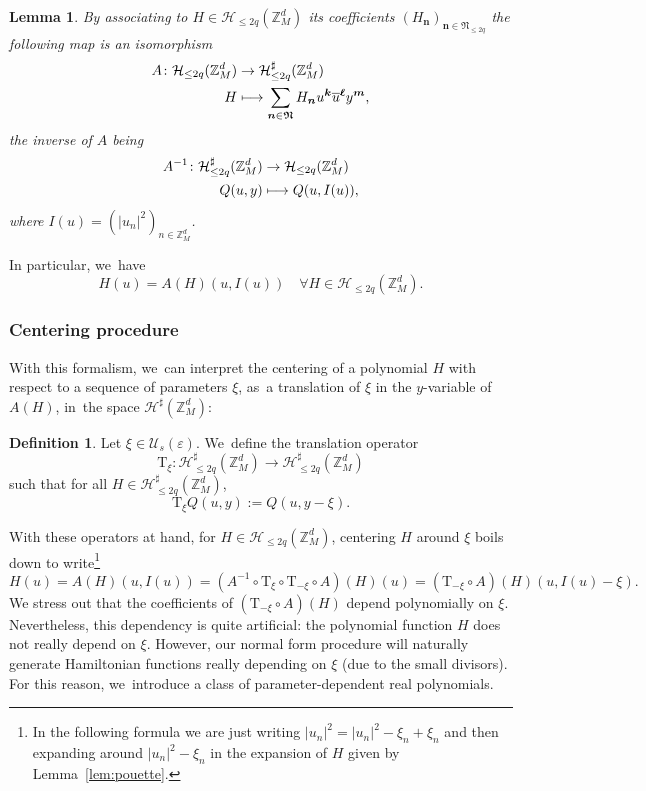 \documentclass[JEP,XML,SOM,Unicode,published]{cedram}
\newcommand\mto{\mathchoice{\longmapsto}{\mapsto}{\mapsto}{\mapsto}}
\theoremstyle{plain}
\newtheorem{lemma}[theorem]{Lemma}
\theoremstyle{definition}
\newtheorem{definition}[theorem]{Definition}
\newcommand{\nb}{{\boldsymbol n}}
\newcommand{\kb}{{\boldsymbol k}}
\newcommand{\lb}{{\boldsymbol \ell}}
\newcommand{\mb}{{\boldsymbol m}}
\newcommand{\Nb}{{\boldsymbol{\mathfrak{N}}}}
\newcommand{\Z}{\mathbb{Z}}
\newcommand{\1}{\mathbf{1}}
\let\epsilon\varepsilon
\begin{document}
\begin{lemma} By associating to $H\in\mathcal{H}_{\leq 2q}(\Z_{M}^{d})$ its coefficients $(H_{\nb})_{\nb\in\Nb_{\leq2q}}$ the following map is an isomorphism
\[
\begin{aligned} A \colon \mathcal{H}_{\leq2q}(\Z_{M}^{d})&\to \mathcal{H}_{\leq2q}^{\sharp}(\Z_{M}^{d}) \\
H &\mto \sum_{\nb\in\Nb} H_{\nb}u^{\kb}\overline{u}^{\lb}y^{\mb},
\end{aligned}
\]
the inverse of $A$ being
\[
\begin{aligned} A^{-1} \colon \mathcal{H}^{\sharp}_{\leq2q}(\Z_{M}^{d})&\to \mathcal{H}_{\leq2q}(\Z_{M}^{d}) \\
Q(u,y) &\mto Q(u,I(u)),
\end{aligned}
\]
where $I(u)=(|u_{n}|^{2})_{n\in\Z_{M}^{d}}$.
\end{lemma}
In particular, we~have
\[
H(u) = A(H)(u,I(u))\quad \forall H\in\mathcal{H}_{\leq2q}(\Z_{M}^{d}).
\]

\subsubsection{Centering procedure}
With this formalism, we~can interpret the centering of a polynomial $H$ with respect to a sequence of parameters $\xi$, as~a translation of $\xi$ in the $y$-variable of $A(H)$, in~the space $\mathcal{H}^{\sharp}(\Z_{M}^{d})$:

\begin{definition} Let $\xi\in\mathcal{U}_{s}(\epsilon)$. We~define the translation operator
\[
\mathrm{T}_{\xi} : \mathcal{H}^{\sharp}_{\leq 2q}(\Z_{M}^{d}) \to\mathcal{H}^{\sharp}_{\leq2q}(\Z_{M}^{d})
\]
such that for all $H\in\mathcal{H}_{\leq2q}^{\sharp}(\Z_{M}^{d})$,
\begin{equation}
\label{eq:tlt}
\mathrm{T}_{\xi}Q(u,y) := Q(u,y-\xi).
\end{equation}
\end{definition}
With these operators at hand, for $H\in\mathcal{H}_{\leq2q}(\Z_{M}^{d})$, centering $H$ around $\xi$ boils down to write\footnote{In the following formula we are just writing $\left|u_{n}\right|^{2}=\left|u_{n}\right|^{2}-\xi_{n}+\xi_{n}$ and then expanding around $\left|u_{n}\right|^{2}-\xi_{n}$ in the expansion of $H$ given by Lemma~\ref{lem:pouette}.}
\begin{equation}
\label{eq:12}
H(u) = A(H)(u,I(u))
= (A^{-1}\circ\mathrm{T}_{\xi}\circ\mathrm{T}_{-\xi}\circ A)(H)(u)
= (\mathrm{T}_{-\xi}\circ A)(H)(u,I(u)-\xi).
\end{equation}
We stress out that the coefficients of $(\mathrm{T}_{-\xi}\circ A)(H)$ depend polynomially on $\xi$. Nevertheless, this dependency is quite artificial: the polynomial function $H$ does not really depend on $\xi$. However, our normal form procedure will naturally generate Hamiltonian functions really depending on $\xi$ (due to the small divisors). For this reason, we~introduce a class of parameter-dependent real polynomials.
\end{document}
